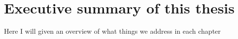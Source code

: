 
\section{Executive summary of this thesis}

Here I will given an overview of what things we address in each chapter